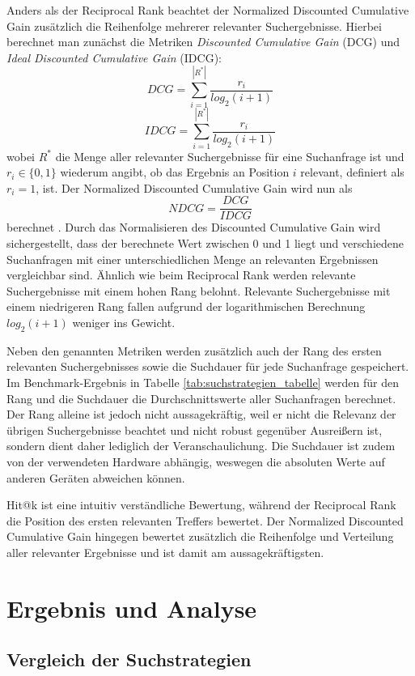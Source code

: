 \documentclass[12pt,letterpaper]{article} %
\begin{document}
Anders als der Reciprocal Rank beachtet der Normalized Discounted Cumulative Gain zusätzlich die Reihenfolge mehrerer relevanter Suchergebnisse.
Hierbei berechnet man zunächst die Metriken \textit{Discounted Cumulative Gain} (DCG) und \textit{Ideal Discounted Cumulative Gain} (IDCG):
$$DCG = \sum_{i=1}^{|R^*|} \frac{r_i}{log_2(i+1)}$$
$$IDCG = \sum_{i=1}^{|R^*|} \frac{r_i}{log_2(i+1)}$$
wobei $R^*$ die Menge aller relevanter Suchergebnisse für eine Suchanfrage ist und $r_i \in \{0, 1\}$ wiederum angibt, ob das Ergebnis an Position $i$ relevant, definiert als $r_i = 1$, ist.
Der Normalized Discounted Cumulative Gain wird nun als
$$NDCG = \frac{DCG}{IDCG}$$
berechnet \citep[S. 6]{gao_semantic_2025} \citep[S. 6]{brama_evaluation_2023}. Durch das Normalisieren des Discounted Cumulative Gain wird sichergestellt, dass der berechnete Wert zwischen 0 und 1 liegt und verschiedene Suchanfragen mit einer unterschiedlichen Menge an relevanten Ergebnissen vergleichbar sind. Ähnlich wie beim Reciprocal Rank werden relevante Suchergebnisse mit einem hohen Rang belohnt. Relevante Suchergebnisse mit einem niedrigeren Rang fallen aufgrund der logarithmischen Berechnung $log_2(i+1)$ weniger ins Gewicht.

Neben den genannten Metriken werden zusätzlich auch der Rang des ersten relevanten Suchergebnisses sowie die Suchdauer für jede Suchanfrage gespeichert.
Im Benchmark-Ergebnis in Tabelle \ref{tab:suchstrategien_tabelle} werden für den Rang und die Suchdauer die Durchschnittswerte aller Suchanfragen berechnet.
Der Rang alleine ist jedoch nicht aussagekräftig, weil er nicht die Relevanz der übrigen Suchergebnisse beachtet und nicht robust gegenüber Ausreißern ist, sondern dient daher lediglich der Veranschaulichung.
Die Suchdauer ist zudem von der verwendeten Hardware abhängig, weswegen die absoluten Werte auf anderen Geräten abweichen können.

Hit@k ist eine intuitiv verständliche Bewertung, während der Reciprocal Rank die Position des ersten relevanten Treffers bewertet.
Der Normalized Discounted Cumulative Gain hingegen bewertet zusätzlich die Reihenfolge und Verteilung aller relevanter Ergebnisse und ist damit am aussagekräftigsten.

\section{Ergebnis und Analyse}
\label{sec:ergebnis_und_analyse}

\subsection{Vergleich der Suchstrategien}
\end{document}
